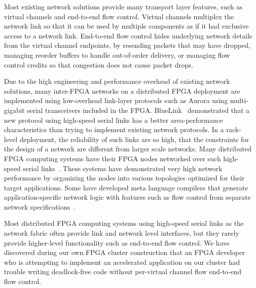 Most existing network solutions provide many transport layer features, such as
virtual channels and end-to-end flow control. Virtual channels multiplex the
network link so that it can be used by multiple components as if it had
exclusive access to a network link. End-to-end flow control hides
underlying network details from the virtual channel endpoints, by resending
packets that may have dropped, managing reorder buffers to handle out-of-order
delivery, or managing flow control credits so that congestion does not cause
packet drops.

Due to the high engineering and performance overhead of existing network
solutions, many inter-FPGA networks on a distributed FPGA deployment are
implemented using low-overhead link-layer protocols such as Aurora using
multi-gigabit serial transceivers included in the FPGA. BlueLink~\cite{bluelink}
demonstrated that a new protocol using high-speed serial links has a better
area-performance characteristics than trying to implement existing network
protocols. In a rack-level deployment, the reliability of such links are so
high, that the constraints for the design of a network are different from larger
scale networks.
Many distributed FPGA computing systems have their FPGA nodes networked over
such high-speed serial links~\cite{ucsd_fpganetwork, maxwell_supercomputer,
toronto_fpga_multi, nc_rcc}. These systems have demonstrated very high network
performance by organizing the nodes into various topologies optimized
for their target applications. Some have developed meta language compilers that
generate application-specific network logic with features such as flow control
from separate network specifications~\cite{kermin_multifpga}.

Most distributed FPGA computing systems using high-speed serial links as the
network fabric often provide link and network level interfaces, but they rarely
provide higher-level functionality such as end-to-end flow control. We have
discovered during our own FPGA cluster construction that an FPGA
developer who is attempting to implement an accelerated application on our
cluster had trouble writing deadlock-free code without per-virtual channel flow
end-to-end flow control. 






